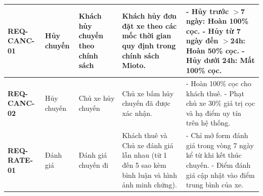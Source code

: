 {\begin{longtable}{p{2.3cm}p{2.2cm}p{2.8cm}p{4.2cm}p{3.8cm}}
\textbf{REQ-CANC-01} & Hủy chuyến & Khách hủy chuyến theo chính sách & Khách hủy đơn đặt xe theo các mốc thời gian quy định trong chính sách Mioto. & - Hủy trước $>$7 ngày: Hoàn 100\% cọc. - Hủy từ 7 ngày đến $>$24h: Hoàn 50\% cọc. - Hủy dưới 24h: Mất 100\% cọc. \\ \midrule
\textbf{REQ-CANC-02} & Hủy chuyến & Chủ xe hủy chuyến & Chủ xe bấm hủy chuyến đã được xác nhận. & - Hoàn 100\% cọc cho khách thuê. - Phạt chủ xe 30\% giá trị cọc và hạ điểm uy tín trên hệ thống. \\ \midrule
\textbf{REQ-RATE-01} & Đánh giá & Đánh giá chuyến đi & Khách thuê và Chủ xe đánh giá lẫn nhau (từ 1 đến 5 sao kèm bình luận và hình ảnh minh chứng). & - Chỉ mở form đánh giá trong vòng 7 ngày kể từ khi kết thúc chuyến. - Điểm đánh giá cập nhật vào điểm trung bình của xe. \\ \midrule
\end{longtable}
}
